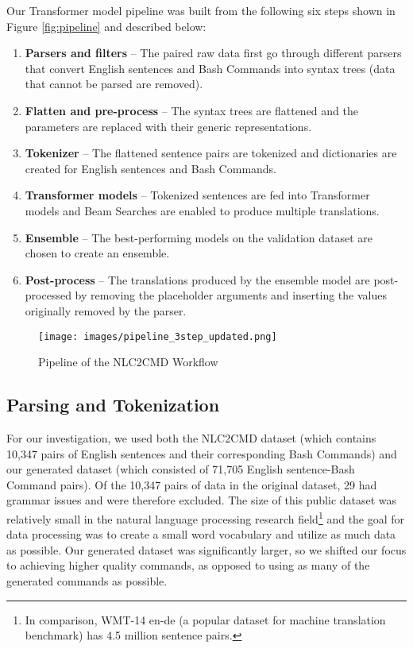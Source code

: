 \documentclass{river-journal}
\begin{document}
Our Transformer model pipeline was built from the following six steps shown in Figure \ref{fig:pipeline} and described below:
\begin{enumerate}
  \item{\bf Parsers and filters} --
  The paired raw data first go through different parsers that convert English sentences and Bash Commands into syntax trees (data that cannot be parsed are removed).
  \item{\bf Flatten and pre-process} --
  The syntax trees are flattened and the parameters are replaced with their generic representations.
  \item{\bf Tokenizer} --
  The flattened sentence pairs are tokenized and dictionaries are created for English sentences and Bash Commands. 
  \item{\bf Transformer models} --
  Tokenized sentences are fed into Transformer models and Beam Searches are enabled to produce multiple translations.
  \item{\bf Ensemble} --
  The best-performing models on the validation dataset are chosen to create an ensemble.
  \item{\bf Post-process} --
  The translations produced by the ensemble model are post-processed by removing the placeholder arguments and inserting the values originally removed by the parser.
\end{enumerate}

\begin{figure*}
    \centering
    \texttt{[image: images/pipeline\_3step\_updated.png]}
    \caption{Pipeline of the NLC2CMD Workflow}
    \label{fig:pipeline3}
\end{figure*}

\subsection{Parsing and Tokenization} 
\label{arch.parsingandtokenization}
For our investigation, we used both the NLC2CMD dataset (which contains 10,347 pairs of English sentences and their corresponding Bash Commands) and our generated dataset (which consisted of 71,705 English sentence-Bash Command pairs). Of the 10,347 pairs of data in the original dataset, 29 had grammar issues and were therefore excluded. The size of this public dataset was relatively small in the natural language processing research field\footnote{In comparison, WMT-14 en-de (a popular dataset for machine translation benchmark) has 4.5 million sentence pairs.} and the goal for data processing was to create a small word vocabulary and utilize as much data as possible. Our generated dataset was significantly larger, so we shifted our focus to achieving higher quality commands, as opposed to using as many of the generated commands as possible.
\end{document}
